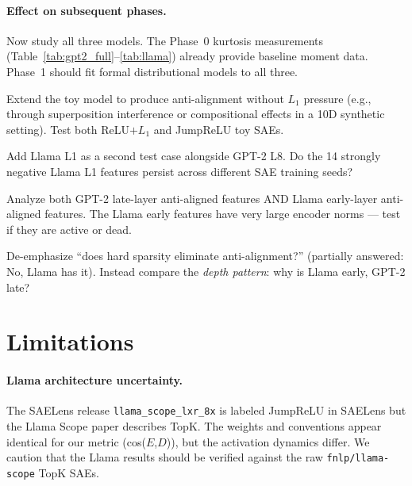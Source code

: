 \documentclass[11pt,a4paper]{article}
\begin{document}
\paragraph{Effect on subsequent phases.}
\begin{description}[nosep, leftmargin=1.5em]
  \item[Phase~1 (Distributional Analysis):] Now study all three models. The Phase~0 kurtosis measurements (Table~\ref{tab:gpt2_full}--\ref{tab:llama}) already provide baseline moment data. Phase~1 should fit formal distributional models to all three.
  \item[Phase~2 (Toy Model):] Extend the toy model to produce anti-alignment without $L_1$ pressure (e.g., through superposition interference or compositional effects in a 10D synthetic setting). Test both ReLU$+L_1$ and JumpReLU toy SAEs.
  \item[Phase~3 (Seed Stability):] Add Llama L1 as a second test case alongside GPT-2 L8. Do the 14 strongly negative Llama L1 features persist across different SAE training seeds?
  \item[Phase~4 (Co-activation):] Analyze both GPT-2 late-layer anti-aligned features AND Llama early-layer anti-aligned features. The Llama early features have very large encoder norms --- test if they are active or dead.
  \item[Phase~5 (Architectural Comparison):] De-emphasize ``does hard sparsity eliminate anti-alignment?'' (partially answered: No, Llama has it). Instead compare the \emph{depth pattern}: why is Llama early, GPT-2 late?
\end{description}

\section{Limitations}
\label{sec:limitations}

\paragraph{Llama architecture uncertainty.} The SAELens release \texttt{llama\_scope\_lxr\_8x} is labeled JumpReLU in SAELens but the Llama Scope paper \citep{he2024} describes TopK. The weights and conventions appear identical for our metric (cos($E$,$D$)), but the activation dynamics differ. We caution that the Llama results should be verified against the raw \texttt{fnlp/llama-scope} TopK SAEs.
\end{document}
